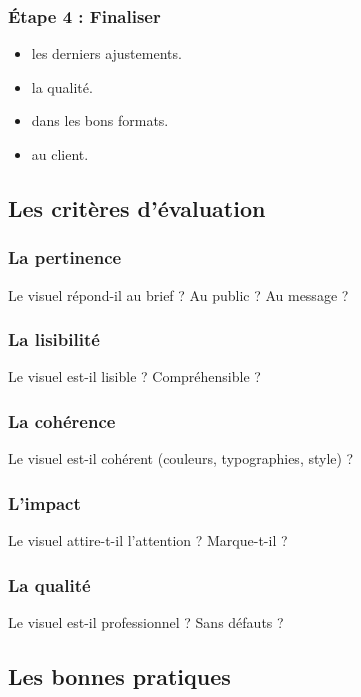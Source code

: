\subsubsection{Étape 4 : Finaliser}

\begin{itemize}
    \item {} les derniers ajustements.
    \item {} la qualité.
    \item {} dans les bons formats.
    \item {} au client.
\end{itemize}

\subsection{Les critères d'évaluation}

\subsubsection{La pertinence}

Le visuel répond-il au brief ? Au public ? Au message ?

\subsubsection{La lisibilité}

Le visuel est-il lisible ? Compréhensible ?

\subsubsection{La cohérence}

Le visuel est-il cohérent (couleurs, typographies, style) ?

\subsubsection{L'impact}

Le visuel attire-t-il l'attention ? Marque-t-il ?

\subsubsection{La qualité}

Le visuel est-il professionnel ? Sans défauts ?

\subsection{Les bonnes pratiques}

